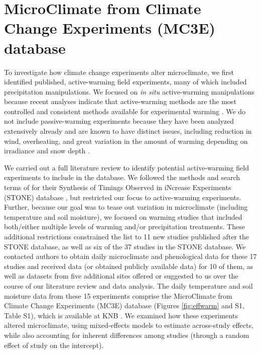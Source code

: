 \documentclass{article}
\begin{document}
\section* {MicroClimate from Climate Change Experiments (MC3E) database}
\par To investigate how climate change experiments alter microclimate, we first identified published, active-warming field experiments, many of which included precipitation manipulations. We focused on \textit{in situ} active-warming manipulations because recent analyses indicate that active-warming methods are the most controlled and consistent methods available for experimental warming \citep{kimball2005,kimball2008,aronson2009,wolkovich2012}. We do not include passive-warming experiments because they have been analyzed extensively already and are known to have distinct issues, including reduction in wind, overheating, and great variation in the amount of warming depending on irradiance and snow depth \citep[][see also Table S2]{marion1997,shaver2000,wolkovich2012,bokhorst2013}.
\par We carried out a full literature review to identify potential active-warming field experiments to include in the database. We followed the methods and search terms of \citet{wolkovich2012} for their Synthesis of Timings Observed in iNcrease Experiments (STONE) database \citep{wolkovich2012}, but restricted our focus to active-warming experiments. Further, because our goal was to tease out variation in microclimate (including temperature and soil moisture), we focused on warming studies that included both/either multiple levels of warming and/or precipitation treatments. These additional restrictions constrained the list to 11 new studies published after the STONE database, as well as six of the 37 studies in the STONE database. We contacted authors to obtain daily microclimate and phenological data for these 17 studies and received data (or obtained publicly available data) for 10 of them, as well as datasets from five additional sites offered or suggested to us over the course of our literature review and data analysis. The daily temperature and soil moisture data from these 15 experiments comprise the MicroClimate from Climate Change Experiments (MC3E) database (Figures \ref{fig:effwarm} and S1, Table S1), which is available at KNB \citep{ettinger2018}. We examined how these experiments altered microclimate, using mixed-effects models to estimate across-study effects, while also accounting for inherent differences among studies (through a random effect of study on the intercept). 
\end{document}
